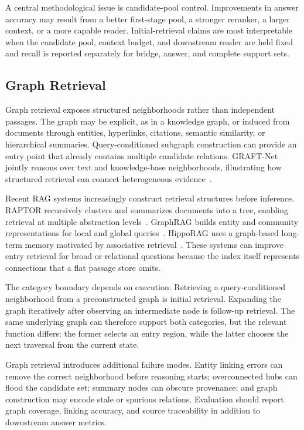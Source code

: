 A central methodological issue is candidate-pool control. Improvements in answer accuracy may result from a better first-stage pool, a stronger reranker, a larger context, or a more capable reader. Initial-retrieval claims are most interpretable when the candidate pool, context budget, and downstream reader are held fixed and recall is reported separately for bridge, answer, and complete support sets.

\subsection{Graph Retrieval}
\label{subsec:graph_retrieval}

Graph retrieval exposes structured neighborhoods rather than independent passages. The graph may be explicit, as in a knowledge graph, or induced from documents through entities, hyperlinks, citations, semantic similarity, or hierarchical summaries. Query-conditioned subgraph construction can provide an entry point that already contains multiple candidate relations. GRAFT-Net jointly reasons over text and knowledge-base neighborhoods, illustrating how structured retrieval can connect heterogeneous evidence~\cite{sun2018graftnet}.

Recent RAG systems increasingly construct retrieval structures before inference. RAPTOR recursively clusters and summarizes documents into a tree, enabling retrieval at multiple abstraction levels~\cite{sarthi2024raptor}. GraphRAG builds entity and community representations for local and global queries~\cite{edge2024graphrag}. HippoRAG uses a graph-based long-term memory motivated by associative retrieval~\cite{gutierrez2024hipporag}. These systems can improve entry retrieval for broad or relational questions because the index itself represents connections that a flat passage store omits.

The category boundary depends on execution. Retrieving a query-conditioned neighborhood from a preconstructed graph is initial retrieval. Expanding the graph iteratively after observing an intermediate node is follow-up retrieval. The same underlying graph can therefore support both categories, but the relevant function differs: the former selects an entry region, while the latter chooses the next traversal from the current state.

Graph retrieval introduces additional failure modes. Entity linking errors can remove the correct neighborhood before reasoning starts; overconnected hubs can flood the candidate set; summary nodes can obscure provenance; and graph construction may encode stale or spurious relations. Evaluation should report graph coverage, linking accuracy, and source traceability in addition to downstream answer metrics.

